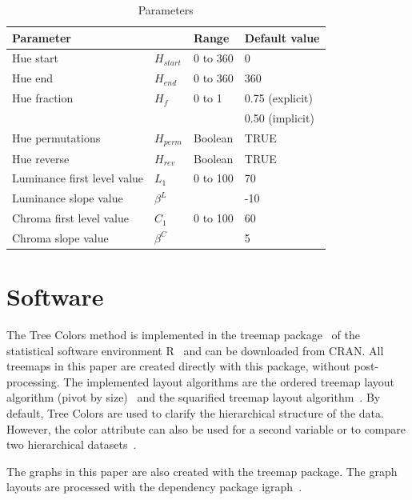 \documentclass[journal]{vgtc}                %
\begin{document}
\begin{table}[tb]
\begin{footnotesize}
\begin{tabular}{llll}
\toprule
\multicolumn{2}{l}{Parameter    } & Range & Default value \\
\midrule
Hue start 				& $H_{start}$ &0 to 360  & 0      \\
Hue end   				& $H_{end}$ & 0 to 360 & 360       \\
Hue fraction 				& $H_f$	& 0 to 1 & 0.75 (explicit) \\
					&	&	 & 0.50 (implicit) \\
Hue permutations 			& $H_{perm}$ &Boolean & TRUE      \\
Hue reverse   			& $H_{rev}$ & Boolean  & TRUE      \\
Luminance first level value 	& $L_1$	& 0 to 100  & 70      \\
Luminance slope value 		& $\beta^L$ &       & -10       \\
Chroma first level value 		& $C_1$ &  0 to 100  & 60       \\
Chroma slope value 		& $\beta^C$ &     & 5       \\
\bottomrule
\end{tabular}
\end{footnotesize}
\caption{Parameters}\label{table:param}
\end{table}




\section{Software}

The Tree Colors method is implemented in the \textsf{treemap} package~\cite{treemap} of the statistical software environment R~\cite{r2013} and can be downloaded from CRAN. All treemaps in this paper are created directly with this package, without post-processing. The implemented layout algorithms are the ordered treemap layout algorithm (pivot by size)~\cite{Bederson2002} and the squarified treemap layout algorithm~\cite{bruls99}. By default, Tree Colors are used to clarify the hierarchical structure of the data. However, the color attribute can also be used for a second variable or to compare two hierarchical datasets~\cite{tennekes2011b}. 

The graphs in this paper are also created with the \textsf{treemap} package. The graph layouts are processed with the dependency package \textsf{igraph}~\cite{igraph}.
\end{document}
